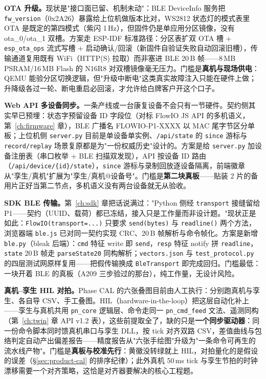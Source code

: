 \textbf{OTA 升级。}现状是"接口面已留、机制未动"：BLE DeviceInfo 服务把 \texttt{fw\_version}（0x2A26）暴露给上位机做版本比对，WS2812 状态灯的模式表里 OTA 是既定的第四模式（紫闪 1\,Hz），但固件仍是单应用分区镜像，没有 ota\_0/ota\_1 双槽。方案走 ESP-IDF 标准路径：分区表扩双 OTA 槽 + \texttt{esp\_ota\_ops} 流式写槽 + 启动确认/回滚（新固件自验证失败自动回滚旧槽），传输通道复用既有 WiFi（HTTP(S) 拉取）而非塞进 BLE 20\,B 帧——8\,MB PSRAM/16\,MB Flash 的 N16R8 对双槽镜像毫无压力。门槛是\textbf{真机与现场供电}：QEMU 能验分区切换逻辑，但"升级中断电"这类真实故障注入只能在硬件上做；升降级各过一轮、断电重启必回滚，才允许给白牌客户开这个口子。

\textbf{Web API 多设备同步。}一条产线或一台康复设备不会只有一节硬件。契约侧其实早已预埋：状态字预留设备 ID 字段位（对标 FlowIO JS API 的多机语义，第~\ref{ch:firmware} 章），BLE 广播名 FLOWIO-P1-XXXX 以 MAC 尾字节区分单板；上位机侧 \texttt{server.py} 目前是单设备单实例、\texttt{/api/state} 的 \texttt{since} 游标与 \texttt{record/replay} 场景复原都是为"一份权威历史"设计的。方案是给 \texttt{server.py} 加设备注册表（串口枚举 + BLE 扫描双发现），API 按设备 ID 路由（\texttt{/api/device/\{id\}/state}），\texttt{since} 游标与录制回放逐设备隔离，前端徽章从"孪生/真机"扩展为"孪生/真机@设备号"。门槛是\textbf{第二块真板}——贴装 2 片的备用片正好当第二节点，多机语义没有两台设备就无从验收。

\textbf{SDK BLE 传输。}第~\ref{ch:sdk} 章把话说满过："Python 侧经 \texttt{transport} 接缝留给 P1——契约（UUID、载荷）都已冻结，接入只是工作量而非设计题。"现状正是如此：\texttt{FlowIO(transport=...)} 只要求 \texttt{send(bytes)} 与 \texttt{readline()} 两个方法，浏览器端 \texttt{ble.js} 已对同一契约实现 CRC、20\,B 帧解析与命令帧化。方案是新增 \texttt{ble.py}（bleak 后端）：\texttt{cmd} 特征 write 即 \texttt{send}，\texttt{resp} 特征 notify 拼 \texttt{readline}，\texttt{state} 20\,B 帧走 \texttt{parseState20} 同构解析；\texttt{vectors.json} 与 \texttt{test\_protocol.py} 的四层测试网原样复用——把假传输换成 \texttt{BleTransport} 即完成回归。门槛最低：一块开着 BLE 的真板（A209 三步验过的那台），纯工作量，无设计风险。

\textbf{真机--孪生 HIL 对拍。}Phase CAL 的六张叠图目前由人工执行：分别跑真机与孪生、各自导 CSV、手工叠图。HIL（hardware-in-the-loop）把这层自动化补上——孪生与真机共用 \texttt{pn\_core} 逻辑层、命令走同一 \texttt{pn\_cmd\_feed} 文法、遥测同构（第~\ref{ch:twin} 章 API v1.2 表），这些前提取全了，缺的只是\textbf{一个同步驱动器}：同一份命令脚本同时馈真机串口与孪生 DLL，按 tick 对齐双路 CSV，差值曲线与包络判定自动产出偏差报告——精度报告从"六张手绘图"升级为"一条命令可再生的流水线产物"。门槛是\textbf{真板与校准先行}：黄徽没转绿就上 HIL，对拍量化的是假设的误差（\S\ref{sec:product-cal} 的排序纪律）；此外真机 50\,ms tick 与孪生节拍的时钟漂移需要一个对齐策略，这恰是对齐器要解决的核心工程题。


